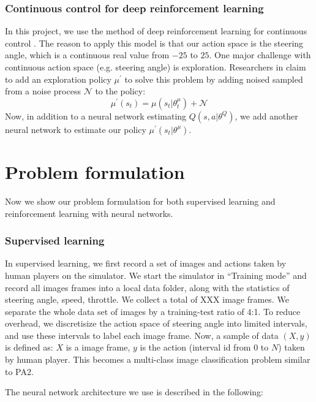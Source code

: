 \documentclass[a4paper]{article}
\begin{document}
\subsubsection{Continuous control for deep reinforcement learning}

In this project, we use the method of deep reinforcement learning for continuous control \cite{continous}.
The reason to apply this model is that our action space is the steering angle, which is a continuous 
real value from $-25$ to $25$. One major challenge with continuous action space (e.g. steering angle)
is exploration. Researchers in \cite{continous} claim to add an exploration policy $\mu^{\prime}$ to
solve this problem by adding noised sampled from a noise process $\mathcal{N}$ to the policy:
\[
    \mu^{\prime}(s_t) = \mu(s_t | \theta_t^{\mu}) + \mathcal{N}
\]
Now, in addition to a neural network estimating $Q(s, a| \theta^Q)$, we add another neural network to
estimate our policy $\mu^{\prime}(s_t | \theta^{\mu})$.

\section{Problem formulation}

Now we show our problem formulation for both supervised learning and reinforcement learning
with neural networks.
\subsubsection{Supervised learning}
In supervised learning, we first record a set of images and actions taken by human players on the
simulator. We start the simulator in ``Training mode'' and record all images frames into a local
data folder, along with the statistics of steering angle, speed, throttle. We collect a total
of XXX image frames. We separate the whole data set of images by a training-test ratio of 4:1.
To reduce overhead, we discretisize the action space of steering angle into limited intervals, and
use these intervals to label each image frame. Now, a sample of data $(X, y)$ is defined as: $X$
is a image frame, $y$ is the action (interval id from $0$ to $N$) taken by human player. This becomes
a multi-class image classification problem similar to PA2.

The neural network architecture we use is described in the following:
\end{document}
